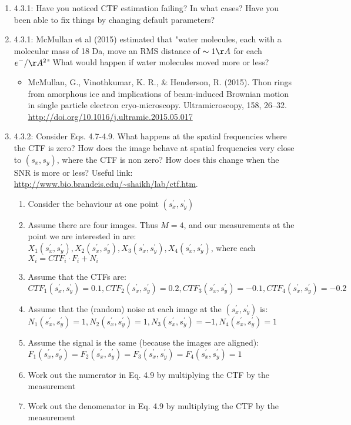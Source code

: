 \documentclass[11pt, oneside]{article}   	%
\begin{document}
\begin{enumerate}
	\item 4.3.1: Have you noticed CTF estimation failing? In what cases? Have you been able to fix things by changing default parameters?
	\item 4.3.1: McMullan et al (2015) estimated that "water molecules, each with a molecular mass of 18 Da, move an RMS distance of $ \sim 1 \AA$ for each $e^-/\AA^2$" What would happen if water molecules moved more or less?
		\begin{itemize}
			\item McMullan, G., Vinothkumar, K. R., \& Henderson, R. (2015). Thon rings from amorphous ice and implications of beam-induced Brownian motion in single particle electron cryo-microscopy. Ultramicroscopy, 158, 26--32. \url{http://doi.org/10.1016/j.ultramic.2015.05.017}
		\end{itemize}
	\item 4.3.2: Consider Eqs. 4.7-4.9. What happens at the spatial frequencies where the CTF is zero? How does the image behave at spatial frequencies very close to $(s_x,s_y)$, where the CTF is non zero? How does this change when the SNR is more or less? Useful link: \url{http://www.bio.brandeis.edu/~shaikh/lab/ctf.htm}.
		\begin{enumerate}
			\item Consider the behaviour at one point  $(s_x^\prime,s_y^\prime)$
			\item Assume there are four images. Thus $M=4$, and our measurements at the point we are interested in are: $X_1(s_x^\prime,s_y^\prime), X_2(s_x^\prime,s_y^\prime), X_3(s_x^\prime,s_y^\prime), X_4(s_x^\prime,s_y^\prime)$, where each $X_i = CTF_i \cdot F_i + N_i$
			\item Assume that the CTFs are: $ CTF_1(s_x^\prime,s_y^\prime)=0.1, CTF_2(s_x^\prime,s_y^\prime)=0.2, CTF_3(s_x^\prime,s_y^\prime)=-0.1, CTF_4(s_x^\prime,s_y^\prime)=-0.2 $
			\item Assume that the (random) noise at each image at the $(s_x^\prime,s_y^\prime)$ is: $N_1(s_x^\prime,s_y^\prime)=1, N_2(s_x^\prime,s_y^\prime)=1, N_3(s_x^\prime,s_y^\prime)=-1, N_4(s_x^\prime,s_y^\prime)=1 $ 
			\item Assume the signal is the same (because the images are aligned): $F_1(s_x^\prime,s_y^\prime)= F_2(s_x^\prime,s_y^\prime)=F_3(s_x^\prime,s_y^\prime)=F_4(s_x^\prime,s_y^\prime)=1 $ 
			\item Work out the numerator in Eq. 4.9 by multiplying the CTF by the measurement
			\item Work out the denomenator in Eq. 4.9 by multiplying the CTF by the measurement

\end{enumerate}
\end{enumerate}
\end{document}
